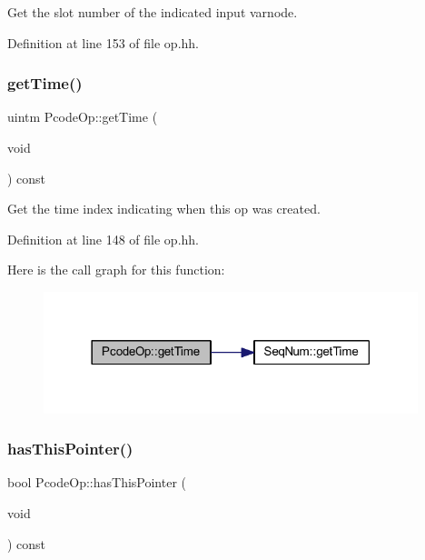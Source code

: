 Get the slot number of the indicated input varnode. 



Definition at line 153 of file op.\+hh.

\mbox{\label{class_pcode_op_a496e0f6fc032ebc815809269b169bd7a}} 
\subsubsection{\texorpdfstring{getTime()}{getTime()}}
{\footnotesize\ttfamily uintm Pcode\+Op\+::get\+Time (\begin{DoxyParamCaption}\item[{void}]{ }\end{DoxyParamCaption}) const\hspace{0.3cm}{\ttfamily [inline]}}



Get the time index indicating when this op was created. 



Definition at line 148 of file op.\+hh.

Here is the call graph for this function\+:
\nopagebreak
\begin{figure}[H]
\begin{center}
\leavevmode
\includegraphics[width=309pt]{class_pcode_op_a496e0f6fc032ebc815809269b169bd7a_cgraph}
\end{center}
\end{figure}
\mbox{\label{class_pcode_op_a9f12117eb8561e7926ab04fdf2a05073}} 
\subsubsection{\texorpdfstring{hasThisPointer()}{hasThisPointer()}}
{\footnotesize\ttfamily bool Pcode\+Op\+::has\+This\+Pointer (\begin{DoxyParamCaption}\item[{void}]{ }\end{DoxyParamCaption}) const\hspace{0.3cm}{\ttfamily [inline]}}



